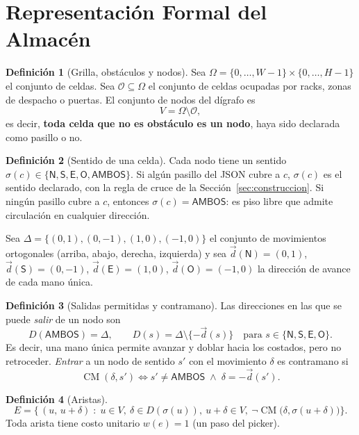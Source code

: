 \documentclass[11pt,a4paper]{article}
\theoremstyle{definition}
\newtheorem{definicion}{Definición}
\newcommand{\sN}{\textsf{N}}
\newcommand{\sS}{\textsf{S}}
\newcommand{\sE}{\textsf{E}}
\newcommand{\sO}{\textsf{O}}
\newcommand{\sA}{\textsf{AMBOS}}
\newcommand{\CM}{\operatorname{CM}}
\begin{document}
\section{Representación Formal del Almacén}\label{sec:repr}

\begin{definicion}[Grilla, obstáculos y nodos]
Sea $\Omega=\{0,\dots,W-1\}\times\{0,\dots,H-1\}$ el conjunto de celdas. Sea $\mathcal{O}\subseteq\Omega$ el conjunto de celdas ocupadas por racks, zonas de despacho o puertas. El conjunto de nodos del dígrafo es
\[ V=\Omega\setminus\mathcal{O}, \]
es decir, \textbf{toda celda que no es obstáculo es un nodo}, haya sido declarada como pasillo o no.
\end{definicion}

\begin{definicion}[Sentido de una celda]
Cada nodo tiene un sentido $\sigma(c)\in\{\sN,\sS,\sE,\sO,\sA\}$. Si algún pasillo del JSON cubre a $c$, $\sigma(c)$ es el sentido declarado, con la regla de cruce de la Sección~\ref{sec:construccion}. Si ningún pasillo cubre a $c$, entonces $\sigma(c)=\sA$: es piso libre que admite circulación en cualquier dirección.
\end{definicion}

Sea $\Delta=\{(0,1),(0,-1),(1,0),(-1,0)\}$ el conjunto de movimientos ortogonales (arriba, abajo, derecha, izquierda) y sea $\vec{d}(\sN)=(0,1)$, $\vec{d}(\sS)=(0,-1)$, $\vec{d}(\sE)=(1,0)$, $\vec{d}(\sO)=(-1,0)$ la dirección de avance de cada mano única.

\begin{definicion}[Salidas permitidas y contramano]
Las direcciones en las que se puede \emph{salir} de un nodo son
\[ D(\sA)=\Delta,\qquad D(s)=\Delta\setminus\{-\vec{d}(s)\}\quad\text{para } s\in\{\sN,\sS,\sE,\sO\}. \]
Es decir, una mano única permite avanzar y doblar hacia los costados, pero no retroceder. \emph{Entrar} a un nodo de sentido $s'$ con el movimiento $\delta$ es contramano si
\[ \CM(\delta,s') \iff s'\neq\sA \;\wedge\; \delta=-\vec{d}(s'). \]
\end{definicion}

\begin{definicion}[Aristas]
\[ E=\bigl\{\,(u,\,u+\delta)\;:\; u\in V,\ \delta\in D(\sigma(u)),\ u+\delta\in V,\ \neg\CM\bigl(\delta,\sigma(u+\delta)\bigr)\bigr\}. \]
Toda arista tiene costo unitario $w(e)=1$ (un paso del picker).
\end{definicion}
\end{document}
